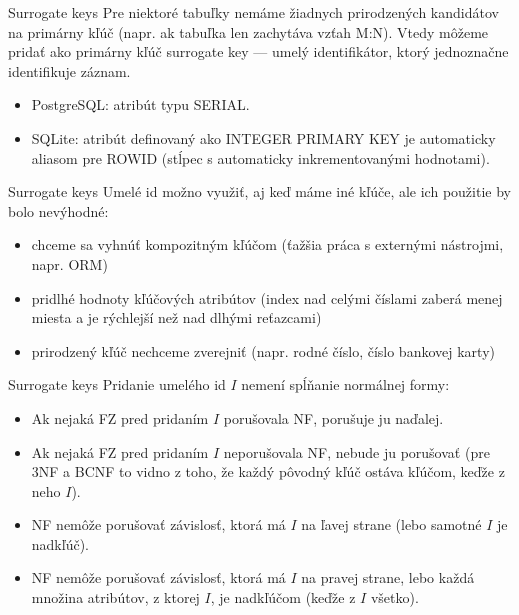 \documentclass[12pt]{beamer}
\begin{document}
\begin{frame}[fragile]{Surrogate keys}
Pre niektoré tabuľky nemáme žiadnych prirodzených kandidátov na primárny kľúč
(napr. ak tabuľka len zachytáva vzťah M:N). Vtedy môžeme pridať ako primárny kľúč
\alert{surrogate key} --- umelý identifikátor, ktorý jednoznačne identifikuje záznam.

\begin{itemize}
\item PostgreSQL: atribút typu SERIAL.
\item SQLite: atribút definovaný ako INTEGER PRIMARY KEY je automaticky aliasom pre ROWID
(stĺpec s automaticky inkrementovanými hodnotami).
\end{itemize}
\end{frame}

\begin{frame}[fragile]{Surrogate keys}
Umelé id možno využiť, aj keď máme iné kľúče, ale ich použitie by bolo nevýhodné:
\begin{itemize}
\item chceme sa vyhnúť kompozitným kľúčom (ťažšia práca s externými nástrojmi, napr. ORM)
\item pridlhé hodnoty kľúčových atribútov (index nad celými číslami zaberá menej miesta
a je rýchlejší než nad dlhými reťazcami)
\item prirodzený kľúč nechceme zverejniť (napr. rodné číslo, číslo bankovej karty)
\end{itemize}
\end{frame}

\begin{frame}[fragile]{Surrogate keys}
Pridanie umelého id $I$ nemení spĺňanie normálnej formy:
\begin{itemize}
\item Ak nejaká FZ pred pridaním $I$ porušovala NF, porušuje ju naďalej.
\item Ak nejaká FZ pred pridaním $I$ neporušovala NF, nebude ju porušovať
    (pre 3NF a BCNF to vidno z toho, že každý pôvodný kľúč ostáva kľúčom, keďže z neho  $I$).
\item NF nemôže porušovať závislosť, ktorá má $I$ na ľavej strane (lebo samotné $I$ je nadkľúč).
\item NF nemôže porušovať závislosť, ktorá má $I$ na pravej strane,
lebo každá množina atribútov, z ktorej  $I$, je nadkľúčom (keďže z $I$  všetko).
\end{itemize}
\end{frame}
\end{document}
